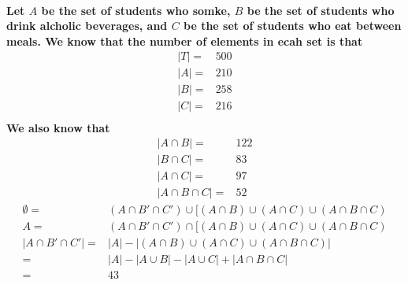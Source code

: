 \documentclass{article}
\begin{document}
        \paragraph{
            Let $A$ be the set of students who somke, $B$ be the set of students who drink alcholic beverages, and $C$ be the set of students who eat between meals. We know that the number of elements in ecah set is that 
            \begin{equation*}
                \begin{split}
                    |T|=&500\\
                    |A|=&210\\
                    |B|=&258\\
                    |C|=&216\\
                \end{split}
            \end{equation*}
            We also know that 
            \begin{equation*}
                \begin{split}
                    |A\cap B|=&122\\
                    |B\cap C|=&83\\
                    |A\cap C|=&97\\
                    |A\cap B\cap C|=&52
                \end{split}
            \end{equation*}
            \begin{equation*}
                \begin{split}
                    \emptyset=&(A\cap B'\cap C')\cup [(A\cap B)\cup (A\cap C)\cup(A\cap B\cap C)\\ 
                    A=&(A\cap B'\cap C')\cap [(A\cap B)\cup (A\cap C)\cup(A\cap B\cap C)\\    
                    |A\cap B'\cap C'|=&|A|-|(A\cap B)\cup (A\cap C)\cup(A\cap B\cap C)|\\
                    =&|A|-|A\cup B|-|A\cup C| +|A\cap B\cap C|\\
                    =&43\\     
                \end{split}
            \end{equation*}
            \begin{equation*}
                \begin{split}

\end{split}
\end{equation*}}
\end{document}
